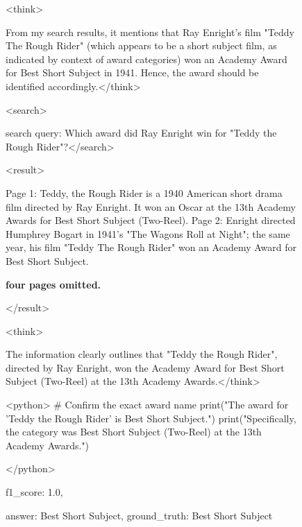 \documentclass{llmxive}
\begin{document}
\begin{figure}[h]
\begin{tcolorbox}
<think> 

From my search results, it mentions that Ray Enright's film "Teddy The Rough Rider" (which appears to be a short subject film, as indicated by context of award categories) won an Academy Award for Best Short Subject in 1941. Hence, the award should be identified accordingly.</think>  


<search> 

search query: Which award did Ray Enright win for "Teddy the Rough Rider"?</search> 

<result>

Page 1: Teddy, the Rough Rider is a 1940 American short drama film directed by Ray Enright. It won an Oscar at the 13th Academy Awards for Best Short Subject (Two-Reel).
Page 2: Enright directed Humphrey Bogart in 1941's "The Wagons Roll at Night"; the same year, his film "Teddy The Rough Rider" won an Academy Award for Best Short Subject.

\textbf{four pages omitted.}

</result>  

<think> 

The information clearly outlines that "Teddy the Rough Rider", directed by Ray Enright, won the Academy Award for Best Short Subject (Two-Reel) at the 13th Academy Awards.</think>  

<python> 
\# Confirm the exact award name
print("The award for 'Teddy the Rough Rider' is Best Short Subject.")
print("Specifically, the category was Best Short Subject (Two-Reel) at the 13th Academy Awards.")

</python>
 
f1\_score: 1.0,

answer: Best Short Subject, ground\_truth: Best Short Subject
 
\end{tcolorbox} 

\end{figure}
\end{document}
